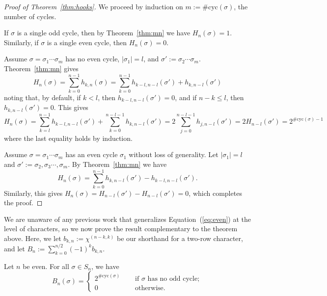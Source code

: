 \documentclass[12pt]{article}
\begin{document}
\begin{proof}[Proof of Theorem~\ref{thm:hooks}]
We proceed by induction on $m := \#\mathrm{cyc}(\sigma)$, the number of cycles.

If $\sigma$ is a single odd cycle, then by Theorem~\ref{thm:mn} we have $H_n(\sigma) = 1$. Similarly, if $\sigma$ is a single even cycle, then $H_n(\sigma) =0$.

\medskip
\noindent Assume $\sigma = \sigma_1\cdots\sigma_m$ has no even cycle, $|\sigma_1| = l$, and $\sigma' := \sigma_2\cdots\sigma_m$. Theorem~\ref{thm:mn} gives
	\[
		H_n(\sigma) = \sum_{k=0}^{n-1} h_{k,n}(\sigma)  = \sum_{k=0}^{n-1} h_{k-l,n-l}(\sigma') + h_{k,n-l}(\sigma')  
	\]
	noting that, by default, if $k < l$, then $h_{k-l,n-l}(\sigma') = 0$, and if $n-k \leq l$, then $h_{k,n-l}(\sigma') = 0$. This gives
	\[
		H_n(\sigma)  = \sum_{k=l}^{n-1} h_{k-l,n-l}(\sigma') + \!\!  \sum_{k=0}^{n-l-1} h_{k,n-l}(\sigma')  
 = 2 \sum_{j=0}^{n-l-1} h_{j,n-l}(\sigma') = 2H_{n-l}(\sigma') = 2^{\#\text{cyc}(\sigma) - 1}
	\]
	where the last equality holds by induction.
	
	
\medskip
	
\noindent Assume $\sigma = \sigma_1 \cdots \sigma_m$ has an even cycle $\sigma_1$ without loss of generality. Let $|\sigma_1| = l$ and $\sigma' := \sigma_2,\sigma_3 \cdots, \sigma_m$. By Theorem~\ref{thm:mn} we have
	\[
		H_n(\sigma) = \sum_{k=0}^{n-1}  h_{k,n-l}(\sigma') - h_{k-l,n-l}(\sigma').
	\]
Similarly, this gives $H_n(\sigma) = H_{n-l}(\sigma') - H_{n-l}(\sigma') = 0$, which completes the proof.
\end{proof}
\noindent We are unaware of any previous work that generalizes Equation~(\ref{eq:even}) at the level of characters, so we now prove the result complementary to the theorem above. Here, we let $b_{k,n} := \chi^{(n-k,k)}$ be our shorthand for a two-row character, and let $B_n := \sum_{k=0}^{n/2} (-1)^k b_{k,n}$.
\begin{theorem}\label{thm:2row}  Let $n$ be even. For all $\sigma \in S_n$, we have 
	$$
		B_n (\sigma) = 
		\begin{cases}
		2^{\#\mathrm{cyc}(\sigma)} \quad& \text{ if } \sigma \text{ has no odd cycle};\\
		0 \quad& \text{ otherwise.}
		\end{cases} 
	$$
\end{theorem}
\end{document}
